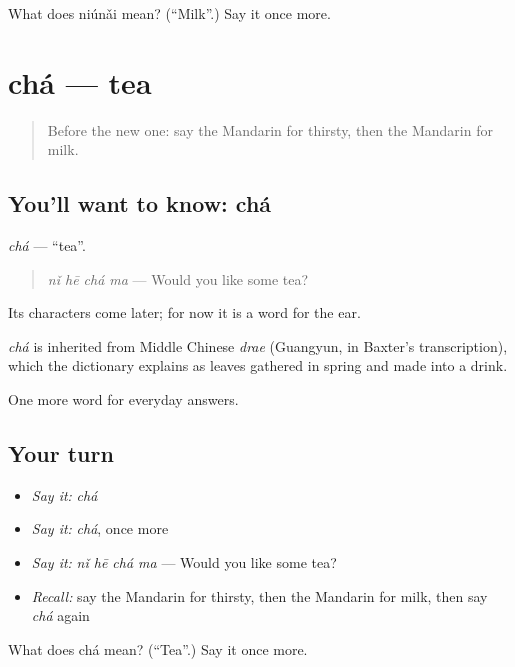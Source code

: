 \begin{tcolorbox}[breakable,colback=teal!4,colframe=teal!35!black,title={Before you move on}]
What does niúnǎi mean? (\textquotedblleft{}Milk\textquotedblright{}.) Say it once more.
\end{tcolorbox}
\section[chá]{chá — tea}

\label{lesson:ZH-C39-cha}



\begin{quote}
Before the new one: say the Mandarin for thirsty, then the Mandarin for milk.
\end{quote}

\subsection*{You'll want to know: chá}
\emph{chá} — \textquotedblleft{}tea\textquotedblright{}.

\begin{quote}
\emph{nǐ hē chá ma} — Would you like some tea?
\end{quote}

Its characters come later; for now it is a word for the ear.

\begin{cousinweb}
\emph{chá} is inherited from Middle Chinese \emph{drae} (Guangyun, in Baxter's transcription), which the dictionary explains as leaves gathered in spring and made into a drink.
\end{cousinweb}

\begin{grammarlens}[title={What you've built}]
One more word for everyday answers.
\end{grammarlens}

\subsection*{Your turn}
\begin{itemize}
\raggedright
  \item \emph{Say it:} \emph{chá}
  \item \emph{Say it:} \emph{chá}, once more
  \item \emph{Say it:} \emph{nǐ hē chá ma} — Would you like some tea?
  \item \emph{Recall:} say the Mandarin for thirsty, then the Mandarin for milk, then say \emph{chá} again
\end{itemize}

\begin{tcolorbox}[breakable,colback=teal!4,colframe=teal!35!black,title={Before you move on}]
What does chá mean? (\textquotedblleft{}Tea\textquotedblright{}.) Say it once more.
\end{tcolorbox}
